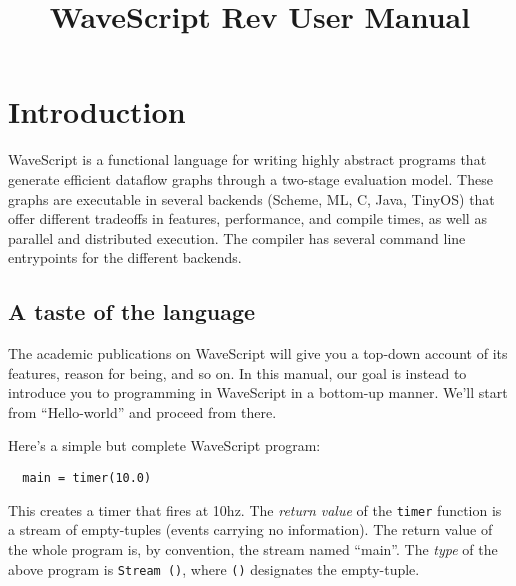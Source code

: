 \documentclass[twocolumn]{report}
\title{WaveScript Rev  User Manual}
\newcommand{\rednote}[1]{{\textcolor{blue}{#1}}}
\newcommand{\cde}{\tt}
\newcommand{\ws}{WaveScript}
\begin{document}
\maketitle


\tableofcontents
\clearpage

\chapter{Introduction}


WaveScript is a functional language for writing highly abstract
programs that generate efficient dataflow graphs through a two-stage
evaluation model.  These graphs are executable in several backends
(Scheme, ML, C, Java, TinyOS) that offer different tradeoffs in
features, performance, and compile times, as well as parallel and
distributed execution.  The compiler has several command line
entrypoints for the different backends.


\section{A taste of the language}\label{s:taste}

The academic publications on WaveScript will give you a top-down
account of its features, reason for being, and so on.  In this manual,
our goal is instead to introduce you to programming in WaveScript in a
bottom-up manner.  We'll start from ``Hello-world'' and proceed from
there.

Here's a simple but complete {\ws} program:
\begin{verbatim}
  main = timer(10.0)
\end{verbatim}
This creates a timer that fires at 10hz.  The {\em return value} of
the {\cde timer} function is a stream of empty-tuples (events carrying
no information).  The return value of the whole program is, by
convention, the stream named ``main''.  The {\em type} of the above
program is {\cde Stream ()}, where {\cde ()} designates the empty-tuple.
\end{document}
